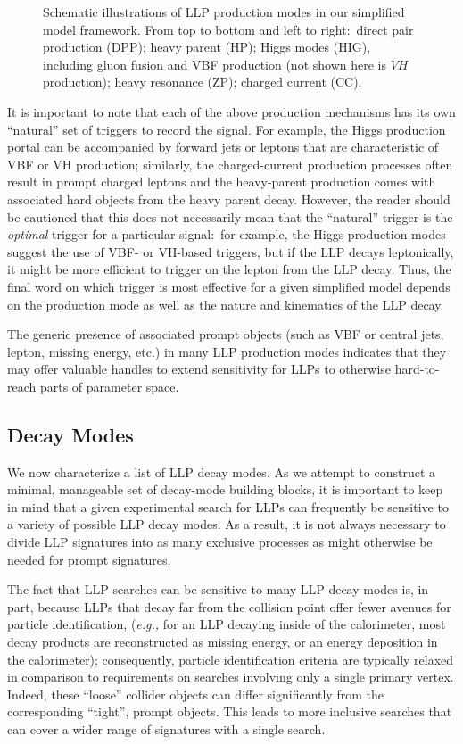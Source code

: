 \begin{figure}[t]
  \caption{Schematic illustrations of LLP production modes in our simplified model framework. From top to bottom and left to right:~direct pair production (DPP); heavy parent (HP); Higgs modes (HIG), including gluon fusion and VBF production (not shown here is $VH$ production); heavy resonance (ZP); charged current (CC).}
  \label{fig:feyndiagram}
\end{figure}

It is important to note that each of the above production mechanisms has its own ``natural'' set of triggers to record the signal. For example, the Higgs production portal can be accompanied by forward jets or leptons that are characteristic of VBF or VH production; similarly, the charged-current production processes often result in prompt charged leptons and the heavy-parent production comes with associated hard objects from the heavy parent decay. However, the reader should be cautioned that this does not necessarily mean that the ``natural'' trigger is the \emph{optimal} trigger for a particular signal:~for example, the Higgs production modes suggest the use of VBF- or VH-based triggers, but if the LLP decays leptonically, it might be more efficient to trigger on the lepton from the LLP decay. Thus, the final word on which trigger is most effective for a given simplified model depends on the production mode as well as the nature and kinematics of the LLP decay.

The generic presence of associated prompt objects (such as VBF or central jets, lepton, missing energy, etc.) in many LLP production modes indicates that they may offer valuable handles to extend sensitivity for LLPs to otherwise hard-to-reach parts of parameter space.


\subsection{Decay Modes}\label{sec:decmodes}


We now characterize a list of LLP decay modes. As we attempt to construct
a minimal, manageable set of decay-mode building blocks, it is important to keep in mind that a given experimental search for LLPs can frequently be
sensitive to a variety of possible LLP decay modes. As a result, it is not always necessary to divide LLP signatures into as many exclusive processes as might otherwise be needed for prompt signatures.

The fact that LLP searches can be sensitive to many LLP decay modes is, in part,
because LLPs that decay far from the collision point offer fewer
avenues for particle identification, (\emph{e.g.,} for an LLP decaying
inside of the calorimeter, most decay products are reconstructed as missing
energy, or an energy deposition in the calorimeter); consequently, particle identification
criteria are typically relaxed in comparison to requirements on searches involving
only a single primary vertex. Indeed, these ``loose'' collider objects can
differ significantly from the corresponding ``tight'', prompt objects. This leads to more 
inclusive searches that can cover a wider range of signatures with a single search.


